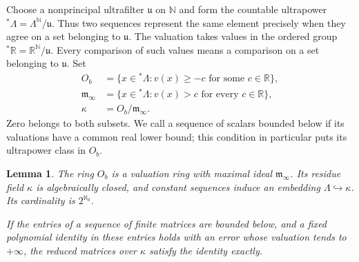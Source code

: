 \documentclass[11pt]{article}
\numberwithin{equation}{section}
\newtheorem{lemma}[theorem]{Lemma}
\theoremstyle{definition}
\theoremstyle{remark}
\newcommand{\R}{\mathbb R}
\newcommand{\N}{\mathbb N}
\begin{document}
Choose a nonprincipal ultrafilter $\mathfrak u$ on $\N$ and form the
countable ultrapower ${}^*\Lambda=\Lambda^{\N}/\mathfrak u$.
Thus two sequences represent the same element precisely when they
agree on a set belonging to $\mathfrak u$.  The valuation takes values
in the ordered group ${}^*\R=\R^{\N}/\mathfrak u$.  Every comparison
of such values means a comparison on a set belonging to
$\mathfrak u$.  Set
\begin{align}
 O_b&=\{x\in{}^*\Lambda:v(x)\ge-c
                         \text{ for some }c\in\R\},\nonumber\\
 \mathfrak m_\infty&=\{x\in{}^*\Lambda:v(x)>c
                         \text{ for every }c\in\R\},\nonumber\\
 \kappa&=O_b/\mathfrak m_\infty.
 \label{eq:field-residue}
\end{align}
Zero belongs to both subsets.  We call a sequence of scalars bounded
below if its valuations have a common real lower bound; this condition
in particular puts its ultrapower class in $O_b$.

\begin{lemma}\label{lem:coarsened-field}
The ring $O_b$ is a valuation ring with maximal ideal
$\mathfrak m_\infty$.  Its residue field $\kappa$ is algebraically
closed, and constant sequences induce an embedding
$\Lambda\hookrightarrow\kappa$.  Its cardinality is $2^{\aleph_0}$.

If the entries of a sequence of finite matrices are bounded below,
and a fixed polynomial identity in these entries holds with an error
whose valuation tends to $+\infty$, the reduced matrices over $\kappa$
satisfy the identity exactly.
\end{lemma}
\end{document}
